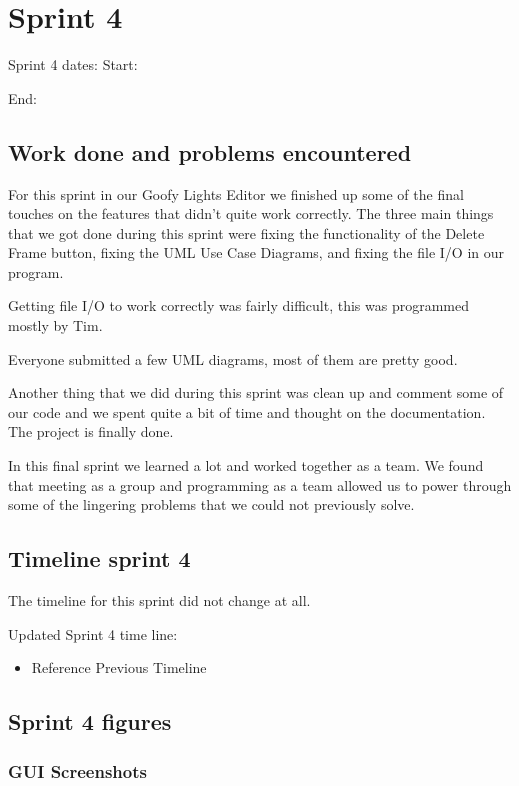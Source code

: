 \documentclass[11pt]{article} %
\begin{document}
{\newpage
\section{Sprint 4}
Sprint 4 dates:  Start: \date{4/20/2017}  End: \date{5/8/2017}

\subsection{Work done and problems encountered}
For this sprint in our Goofy Lights Editor we finished up some of the final touches on the features that didn't quite work correctly. The three main things that we got done during this sprint were fixing the functionality of the Delete Frame button, fixing the UML Use Case Diagrams, and fixing the file I/O in our program.

Getting file I/O to work correctly was fairly difficult, this was programmed mostly by Tim.

Everyone submitted a few UML diagrams, most of them are pretty good.

Another thing that we did during this sprint was clean up and comment some of our code and we spent quite a bit of time and thought on the documentation. The project is finally done.

In this final sprint we learned a lot and worked together as a team. We found that meeting as a group and programming as a team allowed us to power through some of the lingering problems that we could not previously solve.

\subsection{Timeline sprint 4}
%
The timeline for this sprint did not change at all.

\noindent Updated Sprint 4 time line:
\begin{itemize}
	\item Reference Previous Timeline
\end{itemize}

\newpage
\subsection{Sprint 4 figures}
\subsubsection{GUI Screenshots}

}
\end{document}
